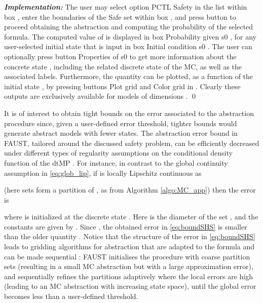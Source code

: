 \documentclass{llncs}
\newcommand*\circled[1]{\tikz[baseline=(char.base)]{\node[shape=circle,draw,inner sep=0.5pt] (char) {#1};}}
\newcommand*\circledb[1]{\tikz[baseline=(char.base)]{\node[shape=circle,draw,inner sep=0.2pt] (char) {#1};}}
\newcommand{\software}{\textsf{FAUST}\xspace}
\newcommand{\boxname}[1]{\textsf{#1}}
\begin{document}
\textit{\textbf{Implementation: }}
The user may select option \textsf{PCTL Safety} in the list within box \circled{1}, 
enter the boundaries of the \textsf{Safe set} within box \circled{8}, 
and press button \circled{6} to proceed obtaining the abstraction and computing the probability of the selected formula.
The computed value of  is displayed in box \boxname{Probability given s0} \circledb{14}, 
for any user-selected initial state  that is input in box \boxname{Initial condition s0} \circledb{14}.
The user can optionally press button \boxname{Properties of s0} \circledb{14} to get more information about the concrete state , 
including the related discrete state  of the MC, as well as the associated labels.
Furthermore, 
the quantity  can be plotted, 
as a function of the initial state , 
by pressing buttons \boxname{Plot grid} and \boxname{Color grid} in \circledb{13}.
Clearly these outputs are exclusively available for models of dimensions .   
\qed

It is of interest to obtain tight bounds on the error associated to the abstraction procedure since, 
given a user-defined error threshold,   
tighter bounds would generate abstract models  with fewer states. 
The abstraction error bound in \software, tailored around the discussed safety problem, 
can be efficiently decreased under different types of regularity assumptions on the conditional density function of the dtMP  \cite{SA13}.  
For instance, in contrast to the global continuity assumption in \eqref{eq:glob_lip}, 
if  is locally Lipschitz continuous as 

(here sets  form a partition of , as from Algorithm \ref{algo:MC_app})  
then the error is 

where  is initialized at the discrete state . 
Here  is the diameter of the set ,
and the constants  are given by 
. 
Since , the obtained error in \eqref{eq:boundSHS} is smaller than the older quantity .
Notice that the structure of the error in \eqref{eq:boundSHS}
leads to gridding algorithms for abstraction that are adapted to the formula and can be made sequential \cite{SA13}: 
\software initialises the procedure with coarse partition sets (resulting in a small MC abstraction but with a large approximation error), 
and sequentially refines the partitions adaptively where the local errors are high 
(leading to an MC abstraction with increasing state space),  
until the global error becomes less than a user-defined threshold. 
\end{document}
